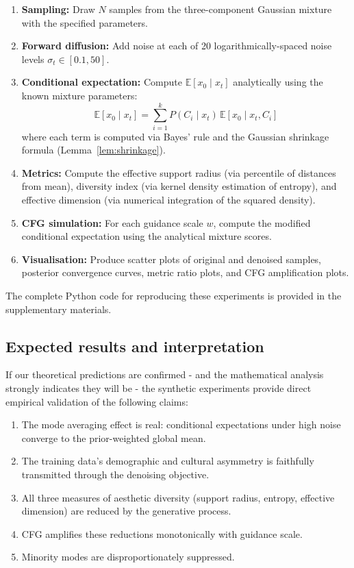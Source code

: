 \documentclass[11pt]{article}
\begin{document}
\begin{enumerate}
 \item \textbf{Sampling:} Draw $N$ samples from the three-component Gaussian mixture with the specified parameters.
 \item \textbf{Forward diffusion:} Add noise at each of 20 logarithmically-spaced noise levels $\sigma_t \in [0.1, 50]$.
 \item \textbf{Conditional expectation:} Compute $\mathbb{E}[x_0 \mid x_t]$ analytically using the known mixture parameters:
 $$\mathbb{E}[x_0 \mid x_t] = \sum_{i=1}^k P(C_i \mid x_t)\, \mathbb{E}[x_0 \mid x_t, C_i]$$
 where each term is computed via Bayes' rule and the Gaussian shrinkage formula (Lemma~\ref{lem:shrinkage}).
 \item \textbf{Metrics:} Compute the effective support radius (via percentile of distances from mean), diversity index (via kernel density estimation of entropy), and effective dimension (via numerical integration of the squared density).
 \item \textbf{CFG simulation:} For each guidance scale $w$, compute the modified conditional expectation using the analytical mixture scores.
 \item \textbf{Visualisation:} Produce scatter plots of original and denoised samples, posterior convergence curves, metric ratio plots, and CFG amplification plots.
\end{enumerate}

The complete Python code for reproducing these experiments is provided in the supplementary materials.

\subsection{Expected results and interpretation}

If our theoretical predictions are confirmed - and the mathematical analysis strongly indicates they will be - the synthetic experiments provide direct empirical validation of the following claims:

\begin{enumerate}
 \item The mode averaging effect is real: conditional expectations under high noise converge to the prior-weighted global mean.
 \item The training data's demographic and cultural asymmetry is faithfully transmitted through the denoising objective.
 \item All three measures of aesthetic diversity (support radius, entropy, effective dimension) are reduced by the generative process.
 \item CFG amplifies these reductions monotonically with guidance scale.
 \item Minority modes are disproportionately suppressed.
\end{enumerate}
\end{document}
